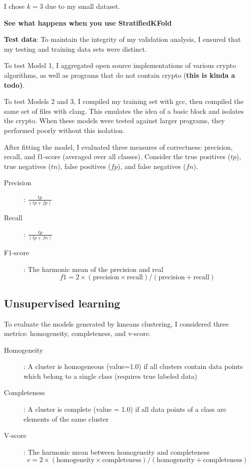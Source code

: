 I chose $k=3$ due to my small dataset.

\textbf{See what happens when you use StratifiedKFold}

\textbf{Test data}:  To maintain the integrity of my validation analysis, I ensured that my testing and training data sets were distinct.

To test Model 1, I aggregated open source implementations of various crypto algorithms, as well as programs that do not contain crypto (\textbf{this is kinda a todo)}.

To test Models 2 and 3, I compiled my training set with gcc, then compiled the same set of files with clang.  This emulates the idea of a basic block and isolates the crypto.  When these models were tested against larger programs, they performed poorly without this isolation.

After fitting the model, I evaluated three measures of correctness: precision, recall, and f1-score (averaged over all classes).  Consider the true positives ($tp$), true negatives ($tn$), false positives ($fp$), and false negatives ($fn$).
\begin{description}
\item[Precision]: $\frac{tp}{(tp+fp)}$
\item[Recall]: $\frac{tp}{(tp+fn)}$
\item[F1-score]: The harmonic mean of the precision and real $$f1=2\times(\text{precision}\times\text{recall})/ (\text{precision}+\text{recall})$$
\end{description}

\subsection{Unsupervised learning}
To evaluate the models generated by kmeans clustering, I considered three metrics: homogeneity, completeness, and v-score.

\begin{description}
	\item[Homogeneity]: A cluster is homogeneous (value=1.0) if all clusters contain data points which belong to a single class (requires true labeled data)
	\item[Completeness]: A cluster is complete (value = 1.0) if all data points of a class are elements of the same cluster
	\item[V-score]: The harmonic mean between homogeneity and completeness $$v=2\times(\text{homogeneity}\times\text{completeness})/ (\text{homogeneity}+\text{completeness})$$
\end{description}

